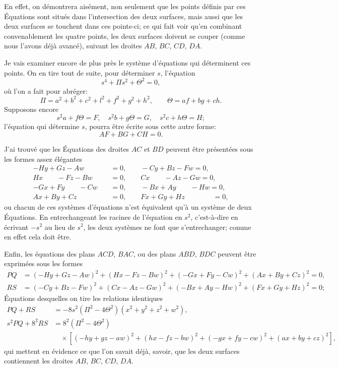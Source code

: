 \documentclass[11pt,a4paper]{article}
\theoremstyle{definition}
\begin{document}
\newpage

\setcounter{page}{419}

En effet, on d\'{e}montrera ais\'{e}ment, non seulement que les points d\'{e}finis par ces \'{E}quations sont situ\'{e}s dans l'intersection des deux surfaces, mais aussi que les deux surfaces se touchent dans ces points-ci; ce qui fait voir qu'en combinant convenablement les quatre points, les deux surfaces doivent se couper (comme nous l'avons d\'{e}j\`{a} avanc\'{e}), suivant les droites $AB$, $BC$, $CD$, $DA$.

Je vais examiner encore de plus pr\`{e}s le syst\`{e}me d'\'{e}quations qui d\'{e}terminent ces points. On en tire tout de suite, pour d\'{e}terminer $s$, l'\'{e}quation
\[
s^{4} + \Pi s^{2} + \Theta^{2} = 0,
\]
o\`{u} l'on a fait pour abr\'{e}ger:
\[
\Pi = a^{2} + b^{2} + c^{2} + l^{2} + f^{2} + g^{2} + h^{2}, \qquad \Theta = af + bg + ch.
\]
Supposons encore
\[
s^{2}a + f\Theta = F, \quad s^{2}b + g\Theta = G, \quad s^{2}c + h\Theta = H;
\]
l'\'{e}quation qui d\'{e}termine $s$, pourra \^{e}tre \'{e}crite sous cette autre forme:
\[
AF + BG + CH = 0.
\]

J'ai trouv\'{e} que les \'{E}quations des droites $AC$ et $BD$ peuvent \^{e}tre pr\'{e}sent\'{e}es sous les formes assez \'{e}l\'{e}gantes
\begin{align*}
-Hy + Gz - Aw &= 0, \qquad -Cy + Bz - Fw = 0, \\
Hx \qquad - Fz - Bw &= 0, \qquad Cx \qquad - Az - Gw = 0, \\
-Gx + Fy \qquad - Cw &= 0, \qquad -Bx + Ay \qquad - Hw = 0, \\
Ax + By + Cz \qquad\qquad &= 0, \qquad Fx + Gy + Hz \qquad\qquad = 0,
\end{align*}
ou chacun de ces syst\`{e}mes d'\'{e}quations n'est \'{e}quivalent qu'\`{a} un syst\`{e}me de deux \'{E}quations. En entrechangeant les racines de l'\'{e}quation en $s^{2}$, c'est-\`{a}-dire en \'{e}crivant $-s^{2}$ au lieu de $s^{2}$, les deux syst\`{e}mes ne font que s'entrechanger; comme en effet cela doit \^{e}tre.

Enfin, les \'{e}quations des plans $ACD$, $BAC$, ou des plans $ABD$, $BDC$ peuvent \^{e}tre exprim\'{e}es sous les formes
\begin{align*}
PQ &= (-Hy + Gz - Aw)^{2} + (Hx - Fz - Bw)^{2} + (-Gx + Fy - Cw)^{2} + (Ax + By + Cz)^{2} = 0, \\
RS &= (-Cy + Bz - Fw)^{2} + (Cx - Az - Gw)^{2} + (-Bx + Ay - Hw)^{2} + (Fx + Gy + Hz)^{2} = 0;
\end{align*}
\'{E}quations desquelles on tire les relations identiques
\begin{align*}
PQ + RS &= -8s^{2}(\Pi^{2} - 4\Theta^{2})(x^{2} + y^{2} + z^{2} + w^{2}), \\
s^{2}PQ + 8^{2}RS &= 8^{2}(\Pi^{2} - 4\Theta^{2}) \\
&\quad \times [(-hy + gz - aw)^{2} + (hx - fz - bw)^{2} + (-gx + fy - cw)^{2} + (ax + by + cz)^{2}],
\end{align*}
qui mettent en \'{e}vidence ce que l'on savait d\'{e}j\`{a}, savoir, que les deux surfaces contiennent les droites $AB$, $BC$, $CD$, $DA$.
\end{document}

